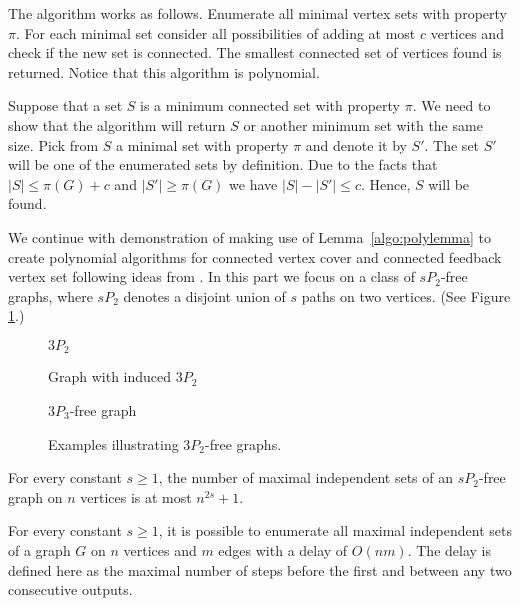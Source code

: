 \begin{myproof}
	The algorithm works as follows. Enumerate all minimal vertex sets with property \(\pi\). 
	For each minimal set consider all possibilities of adding at most \(c\) vertices and check 
	if the new set is connected.
	The smallest connected set of vertices found is returned.
	Notice that this algorithm is polynomial.
	
	Suppose that a set \(S\) is a minimum connected set with property \(\pi\).
	We need to show that the algorithm will return \(S\) or another minimum set with the same size.
	Pick from \(S\) a minimal set with property \(\pi\) and denote it by \(S'\).
	The set \(S'\) will be one of the enumerated sets by definition. Due to the facts that \(|S| \leq {\pi(G) + c}\) and \(|S'| \geq \pi(G)\) we have \(|S| - |S'| \leq c\).
	Hence, \(S\) will be found.
\end{myproof}
We continue with demonstration of making use of Lemma~\ref{algo:polylemma} to create polynomial algorithms for connected vertex cover and
connected feedback vertex set following ideas from \cite{ChiarelliHartinger18}.
In this part we focus on a class of \(sP_2\)-free graphs, where \(sP_2\) denotes a disjoint union of \(s\) paths on two vertices.
(See Figure \ref{f4}.)
\begin{figure}
\centering
\begin{minipage}{.45\textwidth}
  \centering
  
  \caption*{\(3P_2\)}
\end{minipage}%
\begin{minipage}{.5\textwidth}
  \centering
  
  \caption*{Graph with induced \(3P_2\)}
\end{minipage}
\begin{minipage}{.45\textwidth}
  \centering
  
  \caption*{\(3P_3\)-free graph}
\end{minipage}
  \caption{Examples illustrating \(3P_2\)-free graphs.}
  \label{f4}
\end{figure}

\begin{thm}\label{algo:1}
For every constant \(s \geq 1\), the number of maximal independent sets
of an \(sP_2\)-free graph on \(n\) vertices is at most \(n^{2s} + 1\).
\end{thm}

\begin{thm}\label{algo:2}
For every constant \(s \geq 1\), it is possible to enumerate all maximal
independent sets of a graph \(G\) on \(n\) vertices and \(m\) edges with a delay of \(O(nm)\).
The delay is defined here as the maximal number of steps before the first and between any two consecutive outputs.
\end{thm}

